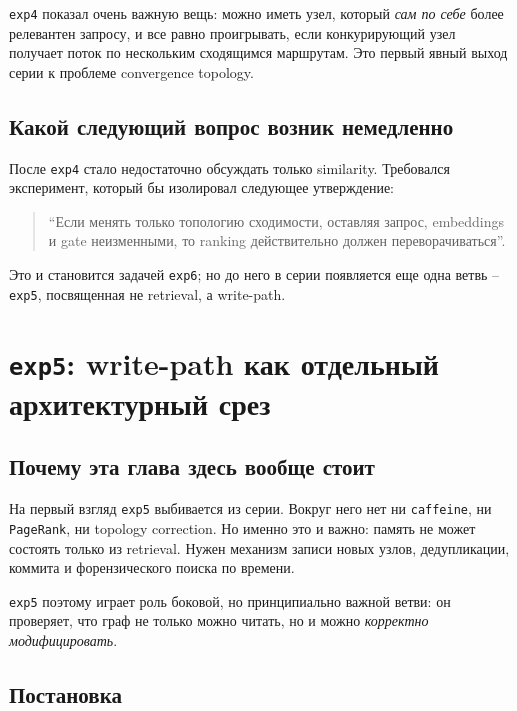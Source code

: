 \begin{takeaway}
\texttt{exp4} показал очень важную вещь: можно иметь узел, который \emph{сам по
себе} более релевантен запросу, и все равно проигрывать, если конкурирующий узел
получает поток по нескольким сходящимся маршрутам. Это первый явный выход серии
к проблеме convergence topology.
\end{takeaway}

\subsection{Какой следующий вопрос возник немедленно}

После \texttt{exp4} стало недостаточно обсуждать только similarity. Требовался
эксперимент, который бы изолировал следующее утверждение:

\begin{quote}
``Если менять только топологию сходимости, оставляя запрос, embeddings и gate
неизменными, то ranking действительно должен переворачиваться''.
\end{quote}

Это и становится задачей \texttt{exp6}; но до него в серии появляется еще одна
ветвь -- \texttt{exp5}, посвященная не retrieval, а write-path.

\section{\texttt{exp5}: write-path как отдельный архитектурный срез}

\subsection{Почему эта глава здесь вообще стоит}

На первый взгляд \texttt{exp5} выбивается из серии. Вокруг него нет ни
\texttt{caffeine}, ни \texttt{PageRank}, ни topology correction. Но именно это и
важно: память не может состоять только из retrieval. Нужен механизм записи новых
узлов, дедупликации, коммита и форензического поиска по времени.

\texttt{exp5} поэтому играет роль боковой, но принципиально важной ветви: он
проверяет, что граф не только можно читать, но и можно \emph{корректно
модифицировать}.

\subsection{Постановка}

